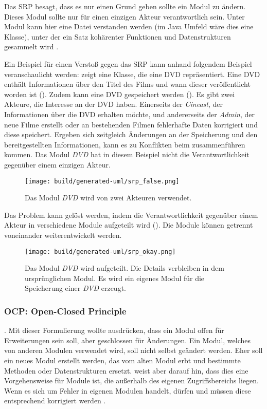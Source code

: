 Das \ac{SRP} besagt, dass es nur einen Grund geben sollte ein Modul zu ändern. Dieses Modul sollte nur für einen einzigen Akteur verantwortlich sein. Unter Modul kann hier eine Datei verstanden werden (im Java Umfeld wäre dies \zb eine Klasse), unter der ein Satz kohärenter Funktionen und Datenstrukturen gesammelt wird \citep[][62]{martin2018}. 

Ein Beispiel für einen Verstoß gegen das \ac{SRP} kann anhand folgendem Beispiel veranschaulicht werden:  zeigt eine Klasse, die eine DVD repräsentiert. Eine DVD enthält Informationen über den Titel des Films und wann dieser veröffentlicht worden ist (). Zudem kann eine DVD gespeichert werden (). Es gibt zwei Akteure, die Interesse an der DVD haben. Einerseits der \textit{Cineast}, der Informationen über die DVD erhalten möchte, und andererseits der \textit{Admin}, der neue Filme erstellt oder an bestehenden Filmen fehlerhafte Daten korrigiert und diese speichert. Ergeben sich zeitgleich Änderungen an der Speicherung und den bereitgestellten Informationen, kann es zu Konflikten beim zusammenführen kommen. Das Modul \textit{DVD} hat in diesem Beispiel nicht die Verantwortlichkeit gegenüber einem einzigen Akteur.

\begin{figure}
  \centering
  \texttt{[image: build/generated-uml/srp\_false.png]}
   \caption{Das Modul \textit{DVD} wird von zwei Akteuren verwendet.}
   \label{fig:srp_false}
\end{figure}

Das Problem kann gelöst werden, indem die Verantwortlichkeit gegenüber einem Akteur in verschiedene Module aufgeteilt wird (). Die Module können getrennt voneinander weiterentwickelt werden.

\begin{figure}
  \centering
  \texttt{[image: build/generated-uml/srp\_okay.png]}
   \caption{Das Modul \textit{DVD} wird aufgeteilt. Die Details verbleiben in dem ursprünglichen Modul. Es wird ein eigenes Modul für die Speicherung einer \textit{DVD} erzeugt.}
   \label{fig:srp_okay}
\end{figure}


\subsubsection{OCP: Open-Closed Principle}

. Mit dieser Formulierung wollte  ausdrücken, dass ein Modul offen für Erweiterungen sein soll, aber geschlossen für Änderungen. Ein Modul, welches von anderen Modulen verwendet wird, soll nicht selbst geändert werden. Eher soll ein neues Modul erstellt werden, das vom alten Modul erbt und bestimmte Methoden oder Datenstrukturen ersetzt.  weist aber darauf hin, dass dies eine Vorgehensweise für Module ist, die außerhalb des eigenen Zugriffsbereichs liegen. Wenn es sich um Fehler in eigenen Modulen handelt, dürfen und müssen diese entsprechend korrigiert werden \citep[vgl.][60\psq]{meyer1997}. 

